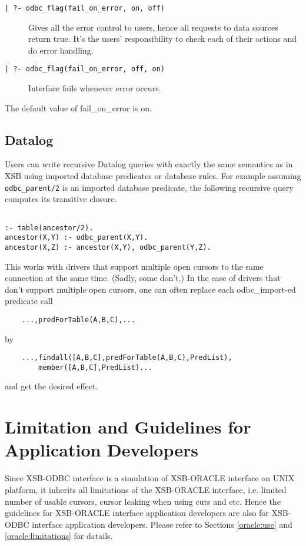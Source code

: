 \begin{description}

\item[\tt | ?- odbc\_flag(fail\_on\_error, on, off)] Gives all the error control 
to users, hence all requests to data sources return true.  It's the users' 
responsibility to check each of their actions and do error handling.

\item[\tt | ?- odbc\_flag(fail\_on\_error, off, on)] Interface fails whenever 
error occurs.
\end{description}

The default value of fail\_on\_error is on.


\subsection{Datalog}
Users can write recursive Datalog queries with exactly the same
semantics as in XSB using imported database predicates or database
rules.  For example assuming {\tt odbc\_parent/2} is an imported database
predicate, the following recursive query computes its transitive closure.

\begin{verbatim}

:- table(ancestor/2).
ancestor(X,Y) :- odbc_parent(X,Y).
ancestor(X,Z) :- ancestor(X,Y), odbc_parent(Y,Z).
\end{verbatim}

This works with drivers that support multiple open cursors to the same
connection at the same time.  (Sadly, some don't.)  In the case of
drivers that don't support multiple open cursors, one can often
replace each odbc\_import-ed predicate call
\begin{verbatim}
    ...,predForTable(A,B,C),...
\end{verbatim}
by
\begin{verbatim}
    ...,findall([A,B,C],predForTable(A,B,C),PredList),
        member([A,B,C],PredList)...
\end{verbatim}
and get the desired effect.

\section{Limitation and Guidelines for Application Developers} \label{Guide}
Since XSB-ODBC interface is a simulation of XSB-ORACLE interface on UNIX 
platform, it inherits all limitations of the XSB-ORACLE interface, i.e. limited 
number of usable cursors, cursor leaking when using cuts and etc.  Hence 
the guidelines for XSB-ORACLE interface application 
developers are also for XSB-ODBC interface application developers.  
Please refer to Sections \ref{oracle:use} and \ref{oracle:limitations}
for datails. 

